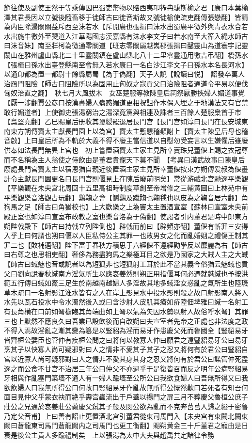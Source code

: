 節往使及副使王然于等乘傳因巴蜀吏幣物以賂西夷卭筰冉駹斯榆之君【康曰本葉榆澤其君長因以立號後隨畜移于徙師古曰徙音斯故又號徙榆使疏吏翻傳張戀翻】皆請為内臣除邊關關益斥西至沬若水【斥開廣也張揖曰沬水出蜀廣平徼外與青衣水合若水出旄牛徼外至僰道入江華陽國志漢嘉縣有沬水李文子曰若水南至大筰入繩水師古曰沬音妹】南至牂柯為徼通零關道【班志零關屬越嶲郡張揖曰鑿靈山為道寰宇記靈關山在雅州盧山縣北二十里靈關鎮在盧山縣北八十二里零靈通用徼吉弔翻】橋孫水【張楫曰孫水出臺登縣南至會無入若水康曰一名白沙江李文子曰孫水本名長河水】以通卬都為置一都尉十餘縣屬蜀【為于偽翻】天子大說【說讀曰悦】　詔發卒萬人治鴈門阻險【師古曰阻險所以為固用止匈奴之寇貢父曰治險阻者通道令平易以便伐匈奴治直之翻】　秋七月大風拔木　女巫楚服等教陳皇后祠祭厭勝挾婦人媚道事覺【厭一涉翻賈公彦曰按漢書婦人蠱惑媚道更相祝詛作木偶人埋之于地漢法又有官禁敢行媚道者】上使御史張湯窮治之湯深竟黨與相連及誅者三百餘人楚服梟首于市【梟堅堯翻】乙巳賜皇后册收其璽綬罷退居長門宫【長門宫如淳曰長門在長安城東南東方朔傳竇太主獻長門園上以為宫】竇太主慙愳稽顙謝上【竇太主陳皇后母也稽音啟】上曰皇后所為不軌於大義不得不廢主當信道以自慰勿受妄言以生嫌懼后雖廢供奉如法長門無異上宫也　初上嘗置酒竇太主家主見所幸賣珠兒董偃上賜之衣冠尊而不名稱為主人翁使之侍飲由是董君貴寵天下莫不聞　【考異曰漢武故事曰陳皇后廢處長門宫竇太主以宿恩猶自親近後置酒主家主見所幸董偃按東方朔傳爰叔為偃畫計令主獻長門園更名曰長門宫則偃見上在陳后廢前明矣】常從游戲北宫馳逐平樂觀【平樂觀在未央宫北周回十五里高祖時制度草創至帝增修之三輔黄圖曰上林苑中有平樂觀樂音洛觀古玩翻】鷄鞠之會【鬭鷄及蹴踘也鞠毬也以皮為之鞠音居六翻】角狗馬之足【師古曰角猶校也】上大歡樂之上為竇太主置酒宣室【蘇林曰宣室未央前殿正室也如淳曰宣室布政教之室也樂音洛為于偽翻】使謁者引内董君是時中郎東方朔陛戟殿下【師古曰持戟立列陛側也】辟戟而前曰【辟頻亦翻】董偃有斬罪三安得入乎上曰何謂也朔曰偃以人臣私侍公主其罪一也敗男女之化而亂婚姻之禮傷王制其罪二也【敗補邁翻】陛下富于春秋方積思于六經偃不遵經勸學反以靡麗為右【師古曰右尊之也思相吏翻】奢侈為務盡狗馬之樂極耳目之欲是乃國家之大賊人主之大蜮【師古曰蜮魅也音或說者以為短狐非也短狐射工耳於此不當其義今俗猶云魅蜮也貢父曰劉向說春秋蜮南方淫氣所生以應哀姜然則朔正用指偃耳何必遷就魅蜮也予按洪範五行傳曰蜮如鱉三足生於南越南越婦人多淫故其地多蜮淫女惑亂之氣所生也陸璣草木疏曰一名射影江淮水皆有之人在岸上影見水中投水影則殺之故曰射影南人將入水先以瓦石投水中令水濁然後入或曰含沙射人皮肌其瘡如疥陸佃埤雅曰蜮一名射工有長角横在口前如弩檐臨其角端曲如上弩以氣為矢因水勢以射人故俗呼水弩】其罪三也上默然不應良久曰吾業已設飲後而自改朔曰夫宣室者先帝之正處也非法度之政不得入焉故淫亂之漸其變為簒是以豎貂為淫而易牙作患慶父死而魯國全【豎貂易牙皆齊桓公嬖臣也管仲有疾桓公問之曰將何以教寡人仲曰願君之遠豎貂易牙公曰易牙烹其子以快寡人尚可疑邪對曰人之情非不愛其子其子之忍又將何有於君公曰豎貂自宫以近寡人尚可疑邪對曰人之情非不愛其身其身之忍又將何有於君公曰諾管仲死盡逐之而公食不甘宫不治居三年公曰仲父不亦過乎于是復皆召而反之明年公病豎貂易牙相與作亂塞門築墻不通人有一婦人踰墻至公所公曰我欲食婦人曰吾無所得又曰我欲飲婦人曰我無所得公曰何故曰豎貂易牙作亂故無所得公慨然歎曰若死者有知吾何面目見仲父乎蒙衣袂而絶乎夀宫蟲流出于戶蓋以揚門之扉三月不葬慶父魯桓公庶子莊公之兄通於哀姜莊公薨慶父弑其子般及閔公欲為亂而不克奔莒莒人歸之縊于密魯乃定父音甫】上曰善有詔止更置酒北宫引董君從東司馬門入【未央宫有東闕北闕東闕曰蒼龍東司馬門蒼龍闕内之司馬門也更工衡翻】賜朔黄金三十斤董君之寵由是日衰是後公主貴人多踰禮制矣　上以張湯為太中大夫與趙禹共定諸律令務